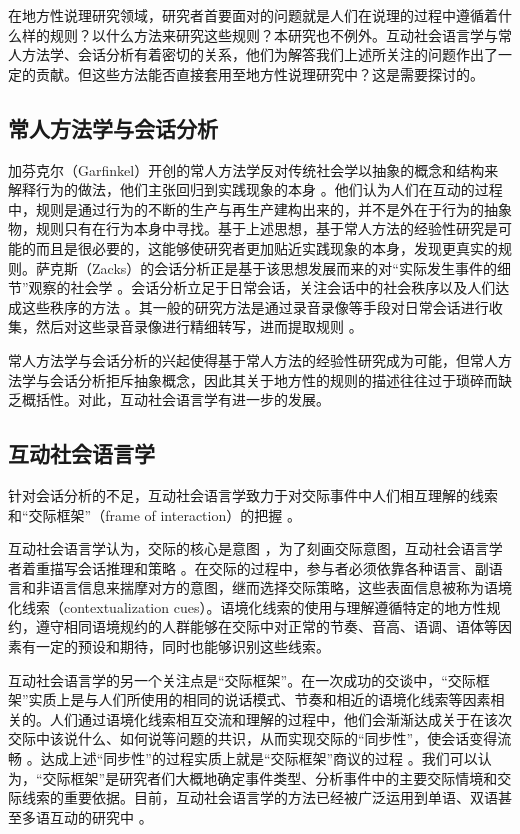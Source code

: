 \documentclass[b5paper,10.5pt,onecolumn,twoside,leqno,UTF8]{article}
\begin{document}
在地方性说理研究领域，研究者首要面对的问题就是人们在说理的过程中遵循着什么样的规则？以什么方法来研究这些规则？本研究也不例外。互动社会语言学与常人方法学、会话分析有着密切的关系，他们为解答我们上述所关注的问题作出了一定的贡献。但这些方法能否直接套用至地方性说理研究中？这是需要探讨的。

\subsection{常人方法学与会话分析}

加芬克尔（Garfinkel）开创的常人方法学反对传统社会学以抽象的概念和结构来解释行为的做法，他们主张回归到实践现象的本身 。他们认为人们在互动的过程中，规则是通过行为的不断的生产与再生产建构出来的，并不是外在于行为的抽象物，规则只有在行为本身中寻找。基于上述思想，基于常人方法的经验性研究是可能的而且是很必要的，这能够使研究者更加贴近实践现象的本身，发现更真实的规则。萨克斯（Zacks）的会话分析正是基于该思想发展而来的对“实际发生事件的细节”观察的社会学 。会话分析立足于日常会话，关注会话中的社会秩序以及人们达成这些秩序的方法 。其一般的研究方法是通过录音录像等手段对日常会话进行收集，然后对这些录音录像进行精细转写，进而提取规则 。

常人方法学与会话分析的兴起使得基于常人方法的经验性研究成为可能，但常人方法学与会话分析拒斥抽象概念，因此其关于地方性的规则的描述往往过于琐碎而缺乏概括性。对此，互动社会语言学有进一步的发展。

\subsection{互动社会语言学}

针对会话分析的不足，互动社会语言学致力于对交际事件中人们相互理解的线索 和“交际框架”（frame of interaction）的把握 。

互动社会语言学认为，交际的核心是意图 ，为了刻画交际意图，互动社会语言学者着重描写会话推理和策略 。在交际的过程中，参与者必须依靠各种语言、副语言和非语言信息来揣摩对方的意图，继而选择交际策略，这些表面信息被称为语境化线索（contextualization cues）。语境化线索的使用与理解遵循特定的地方性规约，遵守相同语境规约的人群能够在交际中对正常的节奏、音高、语调、语体等因素有一定的预设和期待，同时也能够识别这些线索。

互动社会语言学的另一个关注点是“交际框架”。在一次成功的交谈中，“交际框架”实质上是与人们所使用的相同的说话模式、节奏和相近的语境化线索等因素相关的。人们通过语境化线索相互交流和理解的过程中，他们会渐渐达成关于在该次交际中该说什么、如何说等问题的共识，从而实现交际的“同步性”，使会话变得流畅 。达成上述“同步性”的过程实质上就是“交际框架”商议的过程 。我们可以认为，“交际框架”是研究者们大概地确定事件类型、分析事件中的主要交际情境和交际线索的重要依据。目前，互动社会语言学的方法已经被广泛运用到单语、双语甚至多语互动的研究中 。
\end{document}
